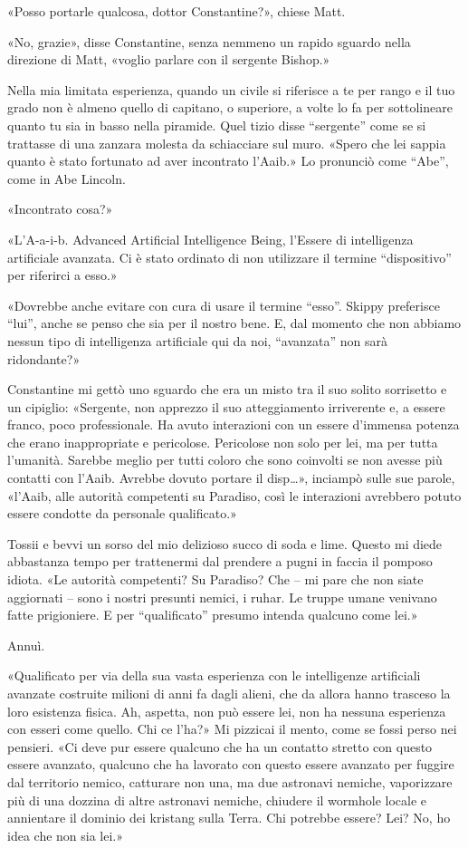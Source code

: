 «Posso portarle qualcosa, dottor Constantine?», chiese Matt.

«No, grazie», disse Constantine, senza nemmeno un rapido sguardo nella
direzione di Matt, «voglio parlare con il sergente Bishop.»

Nella mia limitata esperienza, quando un civile si riferisce a te per
rango e il tuo grado non è almeno quello di capitano, o superiore, a
volte lo fa per sottolineare quanto tu sia in basso nella piramide. Quel
tizio disse ``sergente'' come se si trattasse di una zanzara molesta da
schiacciare sul muro. «Spero che lei sappia quanto è stato fortunato ad
aver incontrato l'Aaib.» Lo pronunciò come ``Abe'', come in Abe Lincoln.

«Incontrato cosa?»

«L'A-a-i-b. Advanced Artificial Intelligence Being, l'Essere di
intelligenza artificiale avanzata. Ci è stato ordinato di non utilizzare
il termine ``dispositivo'' per riferirci a esso.»

«Dovrebbe anche evitare con cura di usare il termine ``esso''. Skippy
preferisce ``lui'', anche se penso che sia per il nostro bene. E, dal
momento che non abbiamo nessun tipo di intelligenza artificiale qui da
noi, ``avanzata'' non sarà ridondante?»

Constantine mi gettò uno sguardo che era un misto tra il suo solito
sorrisetto e un cipiglio: «Sergente, non apprezzo il suo atteggiamento
irriverente e, a essere franco, poco professionale. Ha avuto interazioni
con un essere d'immensa potenza che erano inappropriate e pericolose.
Pericolose non solo per lei, ma per tutta l'umanità. Sarebbe meglio per
tutti coloro che sono coinvolti se non avesse più contatti con l'Aaib.
Avrebbe dovuto portare il disp\ldots», inciampò sulle sue parole,
«l'Aaib, alle autorità competenti su Paradiso, così le interazioni
avrebbero potuto essere condotte da personale qualificato.»

Tossii e bevvi un sorso del mio delizioso succo di soda e lime. Questo
mi diede abbastanza tempo per trattenermi dal prendere a pugni in faccia
il pomposo idiota. «Le autorità competenti? Su Paradiso? Che -- mi pare
che non siate aggiornati -- sono i nostri presunti nemici, i ruhar. Le
truppe umane venivano fatte prigioniere. E per ``qualificato'' presumo
intenda qualcuno come lei.»

Annuì.

«Qualificato per via della sua vasta esperienza con le intelligenze
artificiali avanzate costruite milioni di anni fa dagli alieni, che da
allora hanno trasceso la loro esistenza fisica. Ah, aspetta, non può
essere lei, non ha nessuna esperienza con esseri come quello. Chi ce
l'ha?» Mi pizzicai il mento, come se fossi perso nei pensieri. «Ci deve
pur essere qualcuno che ha un contatto stretto con questo essere
avanzato, qualcuno che ha lavorato con questo essere avanzato per
fuggire dal territorio nemico, catturare non una, ma due astronavi
nemiche, vaporizzare più di una dozzina di altre astronavi nemiche,
chiudere il wormhole locale e annientare il dominio dei kristang sulla
Terra. Chi potrebbe essere? Lei? No, ho idea che non sia lei.»

